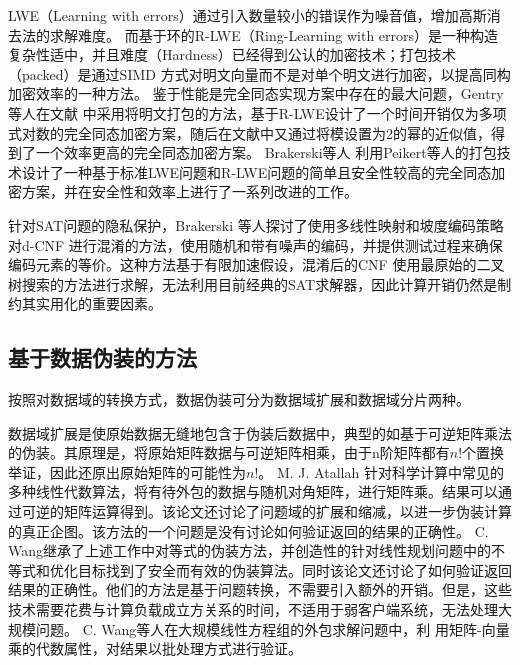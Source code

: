LWE（Learning with errors）通过引入数量较小的错误作为噪音值，增加高斯消去法的求解难度。
而基于环的R-LWE（Ring-Learning with errors）是一种构造复杂性适中，并且难度（Hardness）已经得到公认的加密技术；打包技术（packed）是通过SIMD 方式对明文向量而不是对单个明文进行加密，以提高同构加密效率的一种方法。
鉴于性能是完全同态实现方案中存在的最大问题，Gentry等人在文献 中采用将明文打包的方法，基于R-LWE设计了一个时间开销仅为多项式对数的完全同态加密方案，随后在文献中又通过将模设置为2的幂的近似值，得到了一个效率更高的完全同态加密方案。
Brakerski等人
利用Peikert等人的打包技术设计了一种基于标准LWE问题和R-LWE问题的简单且安全性较高的完全同态加密方案，并在安全性和效率上进行了一系列改进的工作。

针对SAT问题的隐私保护，Brakerski 等人探讨了使用多线性映射和坡度编码策略对d-CNF 进行混淆的方法，使用随机和带有噪声的编码，并提供测试过程来确保编码元素的等价。这种方法基于有限加速假设，混淆后的CNF 使用最原始的二叉树搜索的方法进行求解，无法利用目前经典的SAT求解器，因此计算开销仍然是制约其实用化的重要因素。

\subsection{基于数据伪装的方法}
按照对数据域的转换方式，数据伪装可分为数据域扩展和数据域分片两种。

数据域扩展是使原始数据无缝地包含于伪装后数据中，典型的如基于可逆矩阵乘法的伪装。其原理是，将原始矩阵数据与可逆矩阵相乘，由于n阶矩阵都有$n!$个置换举证，因此还原出原始矩阵的可能性为$n!$。
M. J. Atallah 针对科学计算中常见的多种线性代数算法，将有待外包的数据与随机对角矩阵，进行矩阵乘。结果可以通过可逆的矩阵运算得到。该论文还讨论了问题域的扩展和缩减，以进一步伪装计算的真正企图。该方法的一个问题是没有讨论如何验证返回的结果的正确性。
C. Wang继承了上述工作中对等式的伪装方法，并创造性的针对线性规划问题中的不等式和优化目标找到了安全而有效的伪装算法。同时该论文还讨论了如何验证返回结果的正确性。他们的方法是基于问题转换，不需要引入额外的开销。但是，这些技术需要花费与计算负载成立方关系的时间，不适用于弱客户端系统，无法处理大规模问题。
C. Wang等人在大规模线性方程组的外包求解问题中，利
用矩阵-向量乘的代数属性，对结果以批处理方式进行验证。


